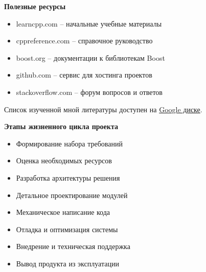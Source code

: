 \documentclass{beamer} %
\begin{document}
\begin{frame}{\bf Полезные ресурсы}

    \begin{itemize}

        \item learncpp.com -- начальные учебные материалы

        \item cppreference.com -- справочное руководство

        \item boost.org -- документации к библиотекам Boost

        \item github.com -- сервис для хостинга проектов

        \item stackoverflow.com -- форум вопросов и ответов

    \end{itemize}

    \begin{block}
    \justifying Список изученной мной литературы доступен на \href{https://docs.google.com/spreadsheets/d/1MAx4-DoZUrZEB210XJ524e-0OogZRvH7QBorja_tGiw/edit?usp=sharing}{Google диске}.
    \end{block}
    
\end{frame}

\begin{frame}{\bf Этапы жизненного цикла проекта}

    \begin{itemize}

        \item Формирование набора требований

        \item Оценка необходимых ресурсов

        \item Разработка архитектуры решения

        \item Детальное проектирование модулей

        \item Механическое написание кода

        \item Отладка и оптимизация системы

        \item Внедрение и техническая поддержка

        \item Вывод продукта из эксплуатации

    \end{itemize}
    
\end{frame}
\end{document}
